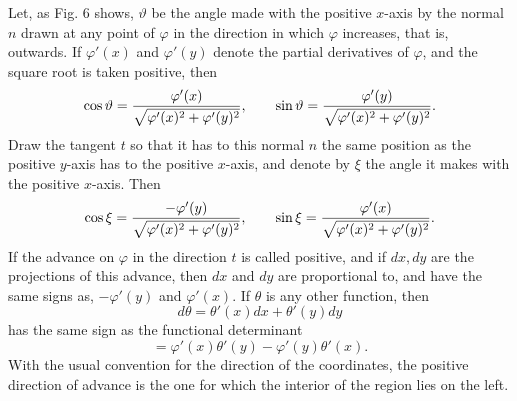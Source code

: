 \documentclass[11pt]{article}
\begin{document}
Let, as Fig. 6 shows, $\vartheta$ be the angle made with the positive $x$-axis by the normal $n$ drawn at any point of $\varphi$ in the direction in which $\varphi$ increases, that is, outwards. If $\varphi'(x)$ and $\varphi'(y)$ denote the partial derivatives of $\varphi$, and the square root is taken positive, then
\[
\cos\vartheta={\varphi'(x)\over\sqrt{\varphi'(x)^2+\varphi'(y)^2}},
\qquad
\sin\vartheta={\varphi'(y)\over\sqrt{\varphi'(x)^2+\varphi'(y)^2}}.
\]
Draw the tangent $t$ so that it has to this normal $n$ the same position as the positive $y$-axis has to the positive $x$-axis, and denote by $\xi$ the angle it makes with the positive $x$-axis. Then
\[
\cos\xi={-\varphi'(y)\over\sqrt{\varphi'(x)^2+\varphi'(y)^2}},
\qquad
\sin\xi={\varphi'(x)\over\sqrt{\varphi'(x)^2+\varphi'(y)^2}}.
\]
If the advance on $\varphi$ in the direction $t$ is called positive, and if $dx,dy$ are the projections of this advance, then $dx$ and $dy$ are proportional to, and have the same signs as, $-\varphi'(y)$ and $\varphi'(x)$. If $\theta$ is any other function, then
\[
        d\theta=\theta'(x)dx+\theta'(y)dy
\]
has the same sign as the functional determinant
\begin{equation}
        [\varphi,\theta]=\varphi'(x)\theta'(y)-\varphi'(y)\theta'(x).
\tag{2}
\end{equation}
With the usual convention for the direction of the coordinates, the positive direction of advance is the one for which the interior of the region lies on the left.
\end{document}
